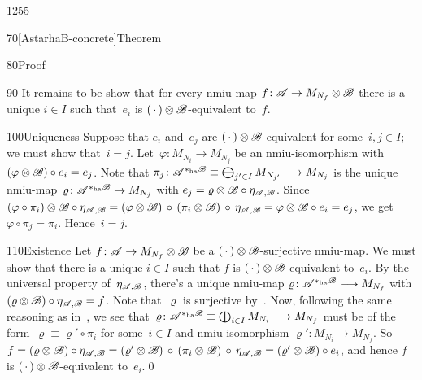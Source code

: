 \begin{parsec}{1255}
\begin{point}{70}[AstarhaB-concrete]{Theorem}
\begin{point}{80}{Proof}
\begin{point}{90}
It remains to be show that for every nmiu-map
$f\colon \mathscr{A}\to M_{N_f}\otimes \mathscr{B}$
there is a unique $i\in I$
such that~$e_i$
is $(\,\cdot\,)\otimes \mathscr{B}$-equivalent
to~$f$.
\end{point}
\begin{point}{100}{Uniqueness}%
Suppose that $e_i$ and~$e_j$ are $(\,\cdot\,)\otimes\mathscr{B}$-equivalent
for some~$i,j\in I$;
we must show that~$i=j$.
Let~$\varphi\colon M_{N_i} \to M_{N_j}$
be an nmiu-isomorphism 
with $(\varphi\otimes \mathscr{B} ) \circ e_i = e_j$.
Note that $\pi_j\colon \mathscr{A}^{*_\mathrm{ha}\mathscr{B}}
    \equiv \bigoplus_{j'\in I} M_{N_{j'}}\longrightarrow
M_{N_j}$
    is the unique nmiu-map~$\varrho\colon \mathscr{A}^{*_\mathrm{ha}\mathscr{B}}
    \to M_{N_j}$ 
with $e_j = \varrho\otimes \mathscr{B} \circ \eta_{\mathscr{A},\mathscr{B}}$.
    Since $(\varphi \circ \pi_i)\otimes \mathscr{B} \circ \eta_{\mathscr{A},\mathscr{B}}
    = (\varphi\otimes \mathscr{B}) \,\circ\, (\pi_i\otimes\mathscr{B} )
    \,\circ\, \eta_{\mathscr{A},\mathscr{B}}
    = \varphi\otimes \mathscr{B} \circ e_i = e_j$,
    we get $\varphi \circ \pi_j = \pi_i$.
    Hence~$i=j$.
\end{point}
\begin{point}{110}{Existence}%
Let $f\colon \mathscr{A}\to M_{N_f}\otimes\mathscr{B}$
be a $(\,\cdot\,)\otimes \mathscr{B}$-surjective  nmiu-map.
We must show that there is a unique $i\in I$
such that $f$ is $(\,\cdot\,)\otimes\mathscr{B}$-equivalent
to~$e_i$.
By the universal property of~$\eta_{\mathscr{A},\mathscr{B}}$,
there's a unique nmiu-map
$\varrho\colon \mathscr{A}^{*_\mathrm{ha}\mathscr{B}}\longrightarrow
M_{N_f}$
with $(\varrho\otimes \mathscr{B})\circ \eta_{\mathscr{A},\mathscr{B}}
=  f$.
Note that~$\varrho$
    is surjective by~.
Now, following the same reasoning as in~,
we see that~$\varrho\colon \mathscr{A}^{*_\mathrm{ha}\mathscr{B}}\equiv
\bigoplus_{i \in I} M_{N_i}\longrightarrow M_{N_f}$
must be of the form~$\varrho\equiv \varrho'\circ \pi_i$
for some~$i\in I$ and nmiu-isomorphism $\varrho'\colon
M_{N_i}\to M_{N_f}$.
So~$ f= (\varrho\otimes \mathscr{B}) \circ \eta_{\mathscr{A},\mathscr{B}}
    = (\varrho'\otimes\mathscr{B}) \,\circ\, 
    (\pi_i\otimes \mathscr{B}) \,\circ\, \eta_{\mathscr{A},\mathscr{B}}
    = (\varrho'\otimes\mathscr{B}) \circ e_i$,
    and hence $f$ is $(\,\cdot\,)\otimes\mathscr{B}$-equivalent
    to~$e_i$.\qed
\end{point}
\end{point}
\end{point}
\end{parsec}
